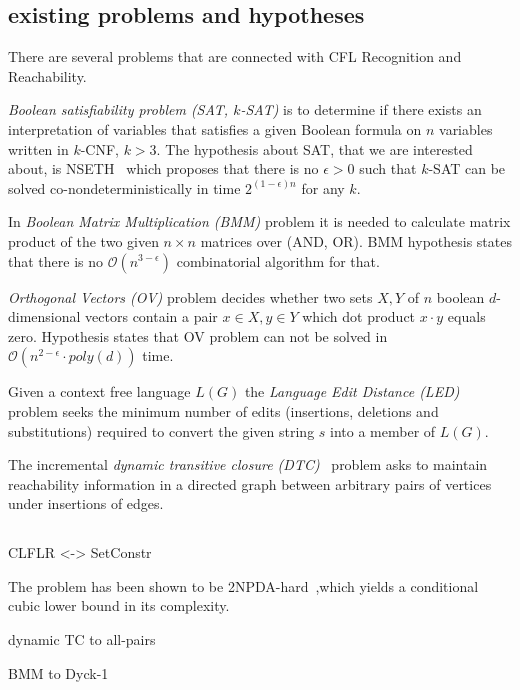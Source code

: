 \documentclass[acmsmall,review,nonacm]{acmart}\settopmatter{printfolios=true,printccs=false,printacmref=false}
\begin{document}
	\subsection{existing problems and hypotheses}
	
	There are several problems that are connected with CFL Recognition and Reachability. 
	
	\emph{Boolean satisfiability problem (SAT, $k$-SAT)} is to determine if there exists an interpretation of variables that satisfies a given Boolean formula on $n$ variables written in $k$-CNF, $k > 3$. The hypothesis about SAT, that we are interested about, is NSETH~\cite{10.1145/2840728.2840746} which proposes that there is no $\epsilon > 0$ such that $k$-SAT can be solved co-nondeterministically in time $2^{(1 - \epsilon) n}$ for any $k$.
	
	In \emph{Boolean Matrix Multiplication (BMM)} problem it is needed to calculate matrix product of the two given $n \times n$ matrices over (AND, OR). BMM hypothesis states that there is no $\mathcal{O}(n^{3 - \epsilon})$ combinatorial algorithm for that. 
	
	\emph{Orthogonal Vectors (OV)} problem decides whether two sets $X, Y$ of $n$ boolean $d$-dimensional vectors contain a pair $x \in X, y \in Y$ which dot product $x \cdot y$ equals zero. Hypothesis states that OV problem can not be solved in $\mathcal{O}(n^{2 - \epsilon} \cdot poly(d))$ time. 
	
	Given a context free language $L(G)$ the \emph{Language Edit Distance (LED)} problem seeks the minimum number of edits (insertions, deletions and substitutions) required to convert the given string $s$ into a member of $L(G)$. 
	
	The incremental \emph{dynamic transitive closure (DTC)}~\cite{Hanauer2020FasterFD} problem asks to maintain reachability information in a directed graph between arbitrary pairs of vertices under insertions of edges.
	
	\subsection{}
	
	CLFLR <-> SetConstr
	
	The problem has been shown to be 2NPDA-hard~\cite{10.5555/788019.788876},which yields a conditional cubic lower bound in its complexity.
		
	dynamic TC to all-pairs
	
	BMM to Dyck-1
	
\end{document}
